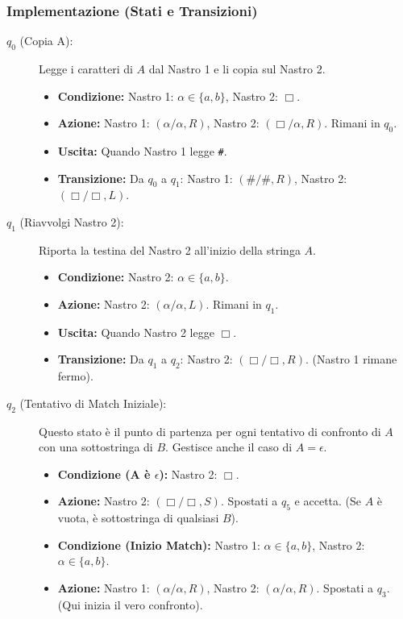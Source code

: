 \documentclass[a4paper, 11pt]{book} %
\theoremstyle{definition}
\begin{document}
\subsubsection{Implementazione (Stati e Transizioni)}
\begin{description}
    \item[$q_0$ (Copia A):] Legge i caratteri di $A$ dal Nastro 1 e li copia sul Nastro 2.
    \begin{itemize}
        \item \textbf{Condizione:} Nastro 1: $\alpha \in \{a,b\}$, Nastro 2: $\Box$.
        \item \textbf{Azione:} Nastro 1: $(\alpha/\alpha, R)$, Nastro 2: $(\Box/\alpha, R)$. Rimani in $q_0$.
        \item \textbf{Uscita:} Quando Nastro 1 legge \texttt{\#}.
        \item \textbf{Transizione:} Da $q_0$ a $q_1$: Nastro 1: $(\#/\#, R)$, Nastro 2: $(\Box/\Box, L)$.
    \end{itemize}
    \item[$q_1$ (Riavvolgi Nastro 2):] Riporta la testina del Nastro 2 all'inizio della stringa $A$.
    \begin{itemize}
        \item \textbf{Condizione:} Nastro 2: $\alpha \in \{a,b\}$.
        \item \textbf{Azione:} Nastro 2: $(\alpha/\alpha, L)$. Rimani in $q_1$.
        \item \textbf{Uscita:} Quando Nastro 2 legge $\Box$.
        \item \textbf{Transizione:} Da $q_1$ a $q_2$: Nastro 2: $(\Box/\Box, R)$. (Nastro 1 rimane fermo).
    \end{itemize}
    \item[$q_2$ (Tentativo di Match Iniziale):] Questo stato è il punto di partenza per ogni tentativo di confronto di $A$ con una sottostringa di $B$. Gestisce anche il caso di $A = \epsilon$.
    \begin{itemize}
        \item \textbf{Condizione (A è $\epsilon$):} Nastro 2: $\Box$.
        \item \textbf{Azione:} Nastro 2: $(\Box/\Box, S)$. Spostati a $q_5$ e accetta. (Se $A$ è vuota, è sottostringa di qualsiasi $B$).
        \item \textbf{Condizione (Inizio Match):} Nastro 1: $\alpha \in \{a,b\}$, Nastro 2: $\alpha \in \{a,b\}$.
        \item \textbf{Azione:} Nastro 1: $(\alpha/\alpha, R)$, Nastro 2: $(\alpha/\alpha, R)$. Spostati a $q_3$. (Qui inizia il vero confronto).

\end{itemize}
\end{description}
\end{document}
